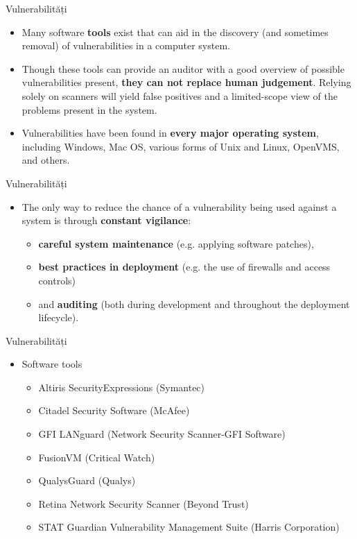 \documentclass[pdf]{beamer}
\begin{document}
\begin{frame}{Vulnerabilități}
\begin{itemize}
\item
Many software \textbf{tools} exist that can aid in the discovery (and sometimes removal) of vulnerabilities in a computer system. 

\item
Though these tools can provide an auditor with a good overview of possible vulnerabilities present, \textbf{they can not replace human judgement}. Relying solely on scanners will yield false positives and a limited-scope view of the problems present in the system.

\item
Vulnerabilities have been found in \textbf{every major operating system}, including Windows, Mac OS, various forms of Unix and Linux, OpenVMS, and others. 

\end{itemize}
\end{frame}



\begin{frame}{Vulnerabilități}
\begin{itemize}
\item
The only way to reduce the chance of a vulnerability being used against a system is through \textbf{constant vigilance}:
\begin{itemize}
\item
\textbf{careful system maintenance} (e.g. applying software patches), 
\item
\textbf{best practices in deployment} (e.g. the use of firewalls and access controls) 
\item
and \textbf{auditing} (both during development and throughout the deployment lifecycle).
\end{itemize}
\end{itemize}
\end{frame}



\begin{frame}{Vulnerabilități}
\begin{itemize}
\item
Software tools
\begin{itemize}
\item
Altiris SecurityExpressions (Symantec)
\item
Citadel Security Software (McAfee)
\item
GFI LANguard (Network Security Scanner-GFI Software) 
\item
FusionVM  (Critical Watch) 
\item
QualysGuard (Qualys)
\item
Retina Network Security Scanner (Beyond Trust)
\item
STAT Guardian Vulnerability Management Suite (Harris Corporation)
\end{itemize}
\end{itemize}
\end{frame}
\end{document}
